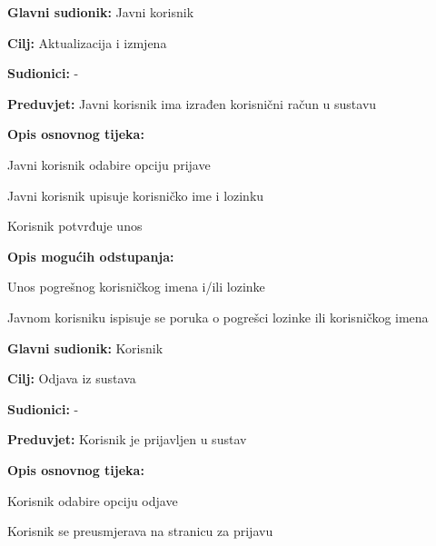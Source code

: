 		
			\noindent {}
			\begin{packed_item}
				
				\item \textbf{Glavni sudionik: }Javni korisnik
				\item  \textbf{Cilj:} Aktualizacija i izmjena 
				\item  \textbf{Sudionici:} -
				\item  \textbf{Preduvjet:} Javni korisnik ima izrađen korisnični račun u sustavu
				\item  \textbf{Opis osnovnog tijeka:}
				
				\item[] \begin{packed_enum}
					
					\item Javni korisnik odabire opciju prijave
					\item Javni korisnik upisuje korisničko ime i lozinku
					\item Korisnik potvrđuje unos
				\end{packed_enum}
				
				\item  \textbf{Opis mogućih odstupanja:}
				
				\item[] \begin{packed_item}
					
					\item[2.a] Unos pogrešnog korisničkog imena i/ili lozinke
					\item[] \begin{packed_enum}
						
						\item Javnom korisniku ispisuje se poruka o pogrešci lozinke ili korisničkog imena
						
					\end{packed_enum}
					
					
				\end{packed_item}
			\end{packed_item}
		
		
			\noindent \underbar{\textbf{UC14 - Odjava}}
			\begin{packed_item}
				
				\item \textbf{Glavni sudionik: }Korisnik
				\item  \textbf{Cilj:} Odjava iz sustava 
				\item  \textbf{Sudionici:} -
				\item  \textbf{Preduvjet:} Korisnik je prijavljen u sustav
				\item  \textbf{Opis osnovnog tijeka:}
				
				\item[] \begin{packed_enum}
					
					\item Korisnik odabire opciju odjave
					\item Korisnik se preusmjerava na stranicu za prijavu
				\end{packed_enum}
				
			\end{packed_item}
		
